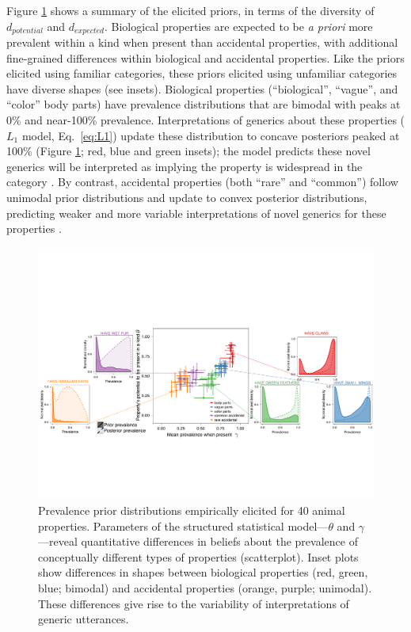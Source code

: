 \documentclass[12pt,letterpaper]{article}
\begin{document}
Figure \ref{fig:prior2} shows a summary of the elicited priors, in terms of the diversity of $d_{potential}$ and $d_{expected}$.
Biological properties are expected to be \emph{a priori} more prevalent within a kind when present than accidental properties, with additional fine-grained differences within biological and accidental properties.
Like the priors elicited using familiar categories, these priors elicited using unfamiliar categories have diverse shapes (see insets). 
Biological properties (``biological'', ``vague'', and ``color'' body parts) have prevalence distributions that are bimodal with peaks at 0\% and near-100\% prevalence. 
Interpretations of generics about these properties ($L_1$ model, Eq.~\ref{eq:L1}) update these distribution to concave posteriors peaked at 100\% (Figure \ref{fig:prior2}; red, blue and green insets); the model predicts these novel generics will be interpreted as implying the property is widespread in the category \cite{Gelman2002}.
By contrast, accidental properties (both ``rare'' and ``common'') follow unimodal prior distributions and update to convex posterior distributions, predicting weaker and more variable interpretations of novel generics for these properties \cite{Cimpian2010c}. 


\begin{figure}
\centering
    \includegraphics[width=\columnwidth]{prevalence-asymmetry-scatterwDists-byItem3.pdf}
    \caption{Prevalence prior distributions empirically elicited for 40 animal properties.
    Parameters of the structured statistical model---$\theta$ and $\gamma$---reveal quantitative differences in beliefs about the prevalence of conceptually different types of properties (scatterplot). 
    Inset plots show differences in shapes between biological properties (red, green, blue; bimodal) and accidental properties (orange, purple; unimodal).   
  These differences give rise to the variability of interpretations of generic utterances. 
  }
  \label{fig:prior2}
\end{figure}
\end{document}
